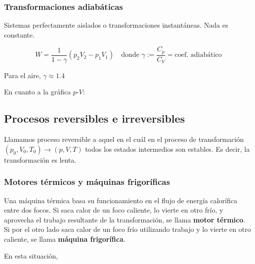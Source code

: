 \documentclass[10pt]{article}
\begin{document}
\subsubsection{Transformaciones adiabáticas}

Sistemas perfectamente aislados o transformaciones instantáneas. Nada es constante.

\[ W = \frac{1}{1 - \gamma}(p_2V_2 - p_1V_1) \quad \text{donde } \gamma := \frac{C_p}{C_V} = \text{coef. adiabático} \]

Para el aire, $ \gamma \approx 1.4 $

En cuanto a la gráfica $p$-$V$:

\begin{center}
\end{center}

\subsection{Procesos reversibles e irreversibles}

Llamamos proceso reversible a aquel en el cuál en el proceso de transformación $ (p_0, V_0, T_0) \to (p, V, T) $ todos los estados intermedios son estables. Es decir, la transformación es lenta.

\subsubsection{Motores térmicos y máquinas frigoríficas}

Una máquina térmica basa su funcionamiento en el flujo de energía calorífica entre dos focos. Si saca calor de un foco caliente, lo vierte en otro frío, y aprovecha el trabajo resultante de la transformación, se llama \textbf{motor térmico}. Si por el otro lado saca calor de un foco frío utilizando trabajo y lo vierte en otro caliente, se llama \textbf{máquina frigorífica}.

En esta situación,
\end{document}
